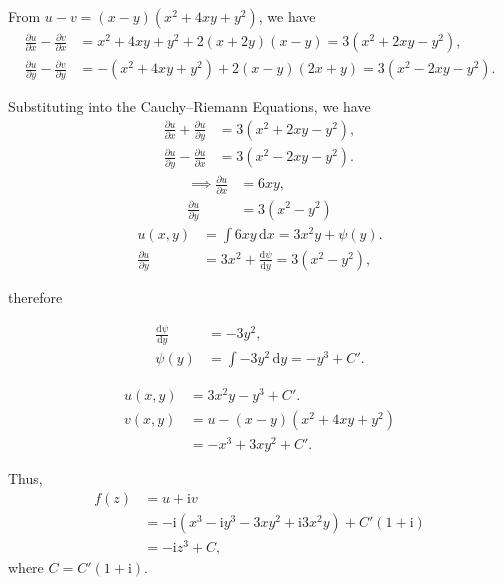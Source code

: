 \documentclass[12pt]{article}
\begin{document}
From \( u - v = \left(x - y\right)\left(x^2 + 4xy + y^2\right) \), we have
\begin{align*}
\frac{\partial u}{\partial {x}} - \frac{\partial v}{\partial {x}} &= x^2 + 4xy + y^2 + 2\left(x + 2y\right)\left(x - y\right) = 3\left(x^2 + 2xy - y^2\right), \\
\frac{\partial u}{\partial {y}} - \frac{\partial v}{\partial {y}} &= -\left(x^2 + 4xy + y^2\right) + 2\left(x - y\right)\left(2x + y\right) = 3\left(x^2 - 2xy - y^2\right).
\end{align*}

Substituting into the Cauchy–Riemann Equations, we have
\begin{align*}
\frac{\partial u}{\partial {x}} + \frac{\partial u}{\partial {y}} &= 3\left(x^2 + 2xy - y^2\right), \\
\frac{\partial u}{\partial {y}} - \frac{\partial u}{\partial {x}} &= 3\left(x^2 - 2xy - y^2\right).
\end{align*}
\begin{align*}
\implies
\frac{\partial u}{\partial {x}} &= 6xy, \\
\frac{\partial u}{\partial {y}} &= 3\left(x^2 - y^2\right)
\end{align*}
\begin{align*}
u(x,y) &= \int 6xy \, \mathrm{d}x = 3x^2 y + \psi(y). \\
\frac{\partial u}{\partial {y}} &= 3x^2 + \frac{\mathrm{d}\psi}{\mathrm{d}y} = 3\left(x^2 - y^2\right),
\end{align*}

therefore

\begin{align*}
\frac{\mathrm{d}\psi}{\mathrm{d}y} &= -3y^2, \\
\psi(y) &= \int -3y^2 \, \mathrm{d}y = -y^3 + C'.
\end{align*}

\begin{align*}
u(x,y) &= 3x^2 y - y^3 + C'. \\
v(x,y) &= u - \left(x - y\right)\left(x^2 + 4xy + y^2\right) \\
&= -x^3 + 3x y^2 + C'.
\end{align*}

Thus,
\begin{align*}
f(z) &= u + \mathrm{i}v \\
&= -\mathrm{i}\left(x^3 - \mathrm{i}y^3 - 3x y^2 + \mathrm{i}3x^2 y\right) + C'\left(1 + \mathrm{i}\right) \\
&= -\mathrm{i} z^3 + {C},
\end{align*}
where \( C = C'\left(1 + \mathrm{i}\right) \).
\end{document}
